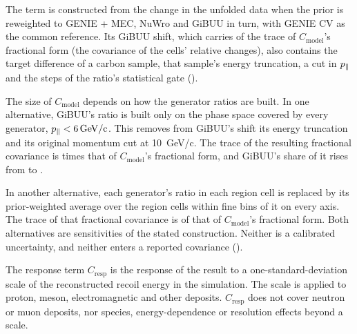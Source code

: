 The term is constructed from the change in the unfolded data when the prior is reweighted to GENIE + MEC, NuWro and GiBUU in turn, with GENIE CV as the common reference. Its GiBUU shift, which carries  of the trace of $C_{\mathrm{model}}$'s fractional form (the covariance of the cells' relative changes), also contains the target difference of a carbon sample, that sample's energy truncation, a cut in $p_{\parallel}$ and the steps of the ratio's statistical gate ().

The size of $C_{\mathrm{model}}$ depends on how the generator ratios are built. In one alternative, GiBUU's ratio is built only on the phase space covered by every generator, $p_{\parallel}<\SI{6}{GeV/c}$. This removes from GiBUU's shift its energy truncation and its original momentum cut at \SI{10}{GeV/c}. The trace of the resulting fractional covariance is  times that of $C_{\mathrm{model}}$'s fractional form, and GiBUU's share of it rises from  to .

In another alternative, each generator's ratio in each region cell is replaced by its prior-weighted average over the region cells within  fine bins of it on every axis. The trace of that fractional covariance is  of that of $C_{\mathrm{model}}$'s fractional form. Both alternatives are sensitivities of the stated construction. Neither is a calibrated uncertainty, and neither enters a reported covariance ().

The response term $C_{\mathrm{resp}}$ is the response of the result to a one-standard-deviation scale of the reconstructed recoil energy in the simulation. The scale is applied to proton, meson, electromagnetic and other deposits. $C_{\mathrm{resp}}$ does not cover neutron or muon deposits, nor species, energy-dependence or resolution effects beyond a scale.

